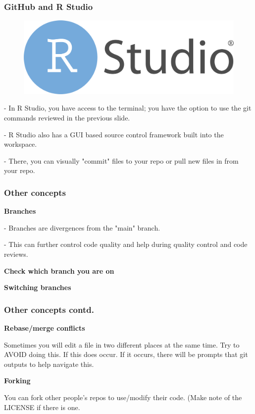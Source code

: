 \documentclass{beamer}
\begin{document}
\begin{frame}
\frametitle{GitHub and R Studio}

\begin{figure}[t]
\includegraphics[scale=0.05]{images/RStudio-Logo-Flat.png}
\end{figure}

- In R Studio, you have access to the terminal; you have the option to use the git commands reviewed in the previous slide. 

- R Studio also has a GUI based source control framework built into the workspace. 

\hspace{10mm} - There, you can visually "commit" files to your repo or pull new files in from your repo.

\end{frame}

\begin{frame}
\frametitle{Other concepts}

\textbf{Branches}

\hspace{10mm} - Branches are divergences from the "main" branch.

\hspace{10mm} - This can further control code quality and help during quality control and code reviews.

\textbf{Check which branch you are on}

\hspace{10mm} 

\textbf{Switching branches}

\hspace{10mm} 

\end{frame}

\begin{frame}
\frametitle{Other concepts contd.}

\textbf{Rebase/merge conflicts}

Sometimes you will edit a file in two different places at the same time. Try to AVOID doing this. If this does occur. If it occurs, there will be prompts that git outputs to help navigate this.

\textbf{Forking}

You can fork other people's repos to use/modify their code. (Make note of the LICENSE if there is one.

\end{frame}
\end{document}
